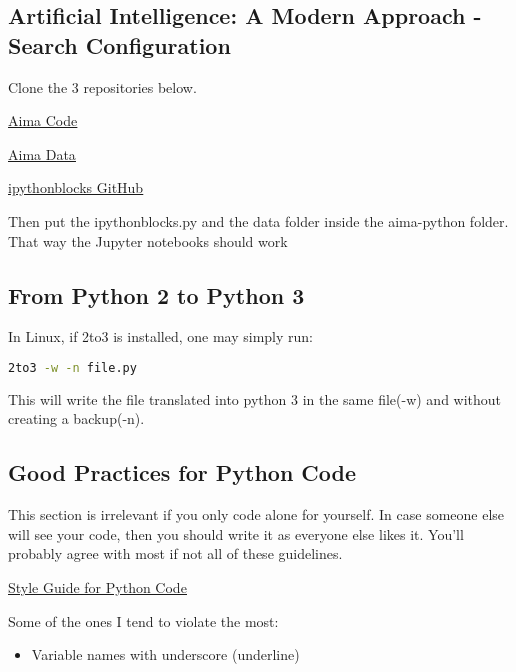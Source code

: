 \subsection{Artificial Intelligence: A Modern Approach - Search Configuration}

Clone the 3 repositories below.

\href{https://github.com/aimacode/aima-python}{\ul{Aima Code}}

\href{https://github.com/aimacode/aima-data/tree/f6cbea61ad0c21c6b7be826d17af5a8d3a7c2c86}{\ul{Aima Data}}

\href{https://github.com/jiffyclub/ipythonblocks/blob/master/ipythonblocks/ipythonblocks.py}{\ul{ipythonblocks GitHub}}

Then put the ipythonblocks.py and the data folder inside the aima-python folder. That way the Jupyter notebooks should work

\subsection{From Python 2 to Python 3}
In Linux, if 2to3 is installed, one may simply run:
\begin{lstlisting}[language=bash]
    2to3 -w -n file.py    
\end{lstlisting}
This will write the file translated into python 3 in the same file(-w) and without creating a backup(-n).


\subsection{Good Practices for Python Code}

This section is irrelevant if you only code alone for yourself. In case someone else will see your code, then you should write it as everyone else likes it. You'll probably agree with most if not all of these guidelines.

\href{https://www.python.org/dev/peps/pep-0008/}{\ul{Style Guide for Python Code}}

Some of the ones I tend to violate the most:
\begin{itemize}
    \item Variable names with underscore (underline)
\end{itemize}
